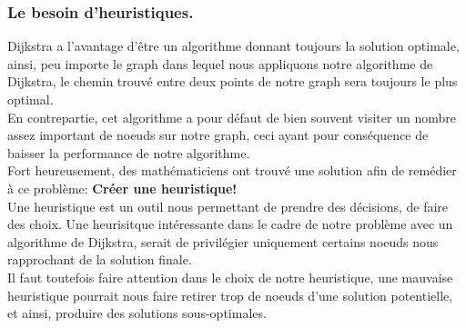 \documentclass[a4paper, 12pt]{article}
\numberwithin{equation}{subsection}
\begin{document}
\subsubsection{Le besoin d'heuristiques.}
Dijkstra a l'avantage d'être un algorithme donnant toujours la solution optimale, ainsi, peu importe le graph dans lequel nous appliquons notre algorithme de Dijkstra, le chemin trouvé entre deux points de notre graph sera toujours le plus optimal. \\
En contrepartie, cet algorithme a pour défaut de bien souvent visiter un nombre assez important de noeuds sur notre graph, ceci ayant pour conséquence de baisser la performance de notre algorithme. \\
Fort heureusement, des mathématiciens ont trouvé une solution afin de remédier à ce problème: {\bf Créer une heuristique!} \\
Une heuristique est un outil nous permettant de prendre des décisions, de faire des choix. Une heurisitque intéressante dans le cadre de notre problème avec un algorithme de Dijkstra, serait de privilégier uniquement certains noeuds nous rapprochant de la solution finale. \\
Il faut toutefois faire attention dans le choix de notre heuristique,
une mauvaise heuristique pourrait nous faire retirer trop de noeuds d'une solution potentielle, et ainsi, produire des solutions sous-optimales. \\
\end{document}
